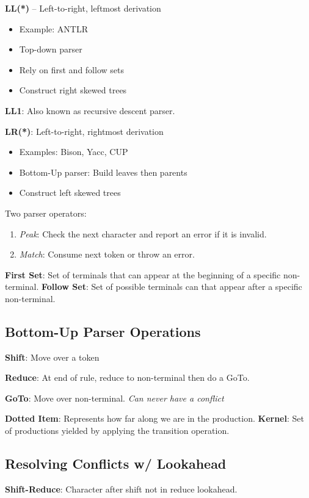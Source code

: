 \documentclass[10pt]{report}
\begin{document}
\begin{multicols}{2}
    \textbf{LL(*)} -- Left-to-right, leftmost derivation
    \begin{itemize}
      \item Example: ANTLR
      \item Top-down parser
      \item Rely on first and follow sets
      \item Construct right skewed trees
    \end{itemize}
    \textbf{LL1}: Also known as recursive descent parser.
  
    \textbf{LR(*)}: Left-to-right, rightmost derivation
    \begin{itemize}
      \item Examples: Bison, Yacc, CUP 
      \item Bottom-Up parser: Build leaves then parents
      \item Construct left skewed trees
    \end{itemize}
  
    Two parser operators:
    \begin{enumerate}
      \item \textit{Peak}: Check the next character and report an error if it is invalid.
      \item \textit{Match}: Consume next token or throw an error.
    \end{enumerate}
  
    \textbf{First Set}: Set of terminals that can appear at the beginning of a specific non-terminal. \textbf{Follow Set}: Set of possible terminals can that appear after a specific non-terminal.
    
    
    \subsection{Bottom-Up Parser Operations}
    
    \textbf{Shift}: Move over a token
    
    \textbf{Reduce}: At end of rule, reduce to non-terminal then do a GoTo.
    
    \textbf{GoTo}: Move over non-terminal. \textit{Can never have a conflict}
    
    \textbf{Dotted Item}: Represents how far along we are in the production. \textbf{Kernel}: Set of productions yielded by applying the transition operation.
    
    \subsection{Resolving Conflicts w/ Lookahead}
    \textbf{Shift-Reduce}: Character after shift not in reduce lookahead.
    

\end{multicols}
\end{document}
